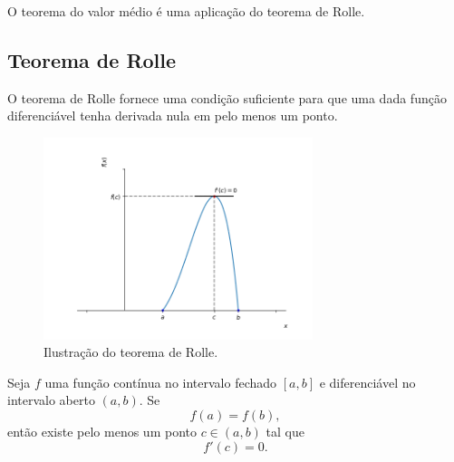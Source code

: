 O teorema do valor médio é uma aplicação do teorema de Rolle.

\subsection{Teorema de Rolle}

O teorema de Rolle fornece uma condição suficiente para que uma dada função diferenciável tenha derivada nula em pelo menos um ponto.

\begin{figure}[H]
  \centering
  \includegraphics[width=0.7\textwidth]{./cap_apderiv/dados/fig_teo_Rolle/fig_teo_Rolle}
  \caption{Ilustração do teorema de Rolle.}
  \label{fig:teo_Rolle}
\end{figure}

\begin{teo}
  Seja $f$ uma função contínua no intervalo fechado $[a, b]$ e diferenciável no intervalo aberto $(a, b)$. Se
  \begin{equation}
    f(a)=f(b),
  \end{equation}
  então existe pelo menos um ponto $c\in (a, b)$ tal que
  \begin{equation}
    f'(c)=0.
  \end{equation}
\end{teo}

